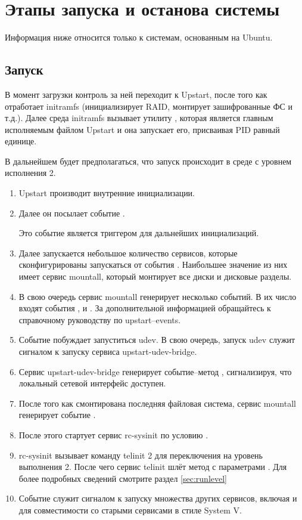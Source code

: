 \label{cpt:job_lifecycle}
\chapter{Этапы запуска и останова системы}
Информация ниже относится только к системам, основанным на Ubuntu.
\section{Запуск}
В момент загрузки контроль за ней переходит к Upstart, после того как отработает initramfs (инициализирует 
RAID, монтирует зашифрованные ФС и т.д.). Далее среда initramfs вызывает утилиту , которая является главным исполняемым файлом Upstart и она запускает его, присваивая PID равный единице.

В дальнейшем будет предполагаться, что запуск происходит в среде с уровнем исполнения 2. \begin{enumerate}
\item Upstart производит внутренние инициализации.
\item Далее он посылает событие .

Это событие является триггером для дальнейших инициализаций.
\item Далее запускается небольшое количество сервисов, которые сконфигурированы запускаться от события . Наибольшее значение из них имеет сервис mountall, который монтирует все диски и дисковые разделы.
\item В свою очередь сервис mountall генерирует несколько событий. В их число входят события ,  и . За дополнительной информацией обращайтесь к справочному руководству по upstart--events.
\item Событие  побуждает запуститься udev. В свою очередь, запуск udev служит сигналом к запуску сервиса upstart-udev-bridge.
\item Сервис upstart-udev-bridge генерирует событие--метод , сигнализируя, 
что локальный сетевой интерфейс доступен.
\item После того как смонтирована последняя файловая система, сервис mountall генерирует событие .
\item После этого стартует сервис rc-sysinit по условию .
\item rc-sysinit вызывает команду telinit 2 для переключения на уровень выполнения 2. После чего сервис telinit шлёт метод с параметрами . Для более подробных сведений смотрите раздел \ref{sec:runlevel}
\item Событие  служит сигналом к запуску множества других сервисов, включая и  для совместимости со старыми сервисами в стиле System V.
\end{enumerate}
